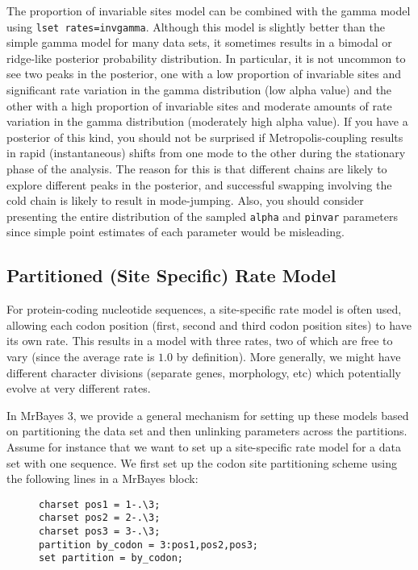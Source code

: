 \documentclass[12pt]{book}
\begin{document}
The proportion of invariable sites model can be combined with the gamma model using \texttt{lset
rates=invgamma}. Although this model is slightly better than the simple gamma model for many data
sets, it sometimes results in a bimodal or ridge-like posterior probability distribution. In
particular, it is not uncommon to see two peaks in the posterior, one with a low proportion of
invariable sites and significant rate variation in the gamma distribution (low alpha value) and the
other with a high proportion of invariable sites and moderate amounts of rate variation in the
gamma distribution (moderately high alpha value). If you have a posterior of this kind, you should
not be surprised if Metropolis-coupling results in rapid (instantaneous) shifts from one mode to
the other during the stationary phase of the analysis. The reason for this is that different chains
are likely to explore different peaks in the posterior, and successful swapping involving the cold
chain is likely to result in mode-jumping. Also, you should consider presenting the entire
distribution of the sampled \texttt{alpha} and \texttt{pinvar} parameters since simple point
estimates of each parameter would be misleading.

\subsection{Partitioned (Site Specific) Rate Model}

For protein-coding nucleotide sequences, a site-specific rate model is often used, allowing each
codon position (first, second and third codon position sites) to have its own rate. This results in
a model with three rates, two of which are free to vary (since the average rate is $1.0$ by
definition). More generally, we might have different character divisions (separate genes,
morphology, etc) which potentially evolve at very different rates.

In MrBayes 3, we provide a general mechanism for setting up these models based on partitioning the
data set and then unlinking parameters across the partitions. Assume for instance that we want to
set up a site-specific rate model for a data set with one sequence. We first set up the codon site
partitioning scheme using the following lines in a MrBayes block:

\begin{figure}[h]
\centering
\begin{BVerbatim}[fontsize=\small]
charset pos1 = 1-.\3;
charset pos2 = 2-.\3;
charset pos3 = 3-.\3;
partition by_codon = 3:pos1,pos2,pos3;
set partition = by_codon;
\end{BVerbatim}
\end{figure}
\end{document}
